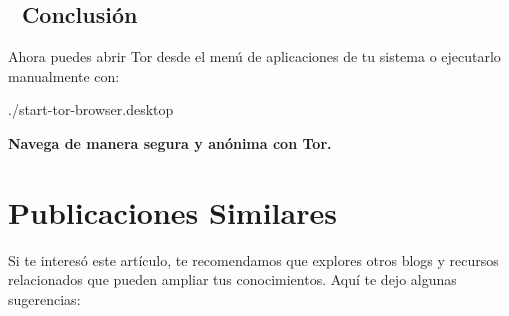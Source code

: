 \documentclass[
  jou,
  floatsintext,
  longtable,
  a4paper,
  nolmodern,
  notxfonts,
  notimes,
  12pt,
  colorlinks=true,linkcolor=blue,citecolor=blue,urlcolor=blue]{apa7}
\newenvironment{Shaded}{\begin{snugshade}}{\end{snugshade}}
\newcommand{\ExtensionTok}[1]{\textcolor[rgb]{0.00,0.23,0.31}{#1}}
\begin{document}
\subsection{🎯 Conclusión}\label{conclusiuxf3n}

Ahora puedes abrir Tor desde el menú de aplicaciones de tu sistema o
ejecutarlo manualmente con:

\begin{Shaded}
\begin{Highlighting}[]
   \ExtensionTok{./start{-}tor{-}browser.desktop}
\end{Highlighting}
\end{Shaded}

\textbf{Navega de manera segura y anónima con Tor.}

\section{Publicaciones Similares}\label{publicaciones-similares}

Si te interesó este artículo, te recomendamos que explores otros blogs y
recursos relacionados que pueden ampliar tus conocimientos. Aquí te dejo
algunas sugerencias:
\end{document}
